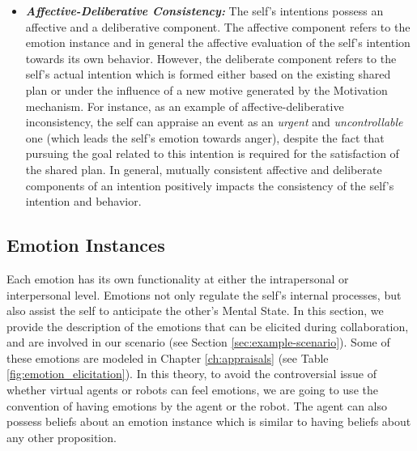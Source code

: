 \documentclass[12pt]{report}
\begin{document}
\begin{itemize}
  \item \textbf{\textit{Affective-Deliberative Consistency:}} The self's
  intentions possess an affective and a deliberative component. The affective
  component refers to the emotion instance and in general the affective
  evaluation of the self's intention towards its own behavior. However, the
  deliberate component refers to the self's actual intention which is formed
  either based on the existing shared plan or under the influence of a new
  motive generated by the Motivation mechanism. For instance, as an example of
  affective-deliberative inconsistency, the self can appraise an event as an
  \textit{urgent} and \textit{uncontrollable} one (which leads the self's
  emotion towards anger), despite the fact that pursuing the goal related
  to this intention is required for the satisfaction of the shared plan. In
  general, mutually consistent affective and deliberate components of an
  intention positively impacts the consistency of the self's intention and
  behavior.
\end{itemize}

\subsection{Emotion Instances}
\label{section-emotion-instances}

Each emotion has its own functionality at either the intrapersonal or
interpersonal level. Emotions not only regulate the self's internal processes,
but also assist the self to anticipate the other's Mental State. In this
section, we provide the description of the emotions that can be elicited
during collaboration, and are involved in our scenario (see Section
\ref{sec:example-scenario}). {\color{red}Some of these emotions are modeled in
Chapter \ref{ch:appraisals} (see Table \ref{fig:emotion_elicitation}).} In this
theory, to avoid the controversial issue of whether virtual agents or robots can
feel emotions, we are going to use the convention of having emotions by the
agent or the robot. The agent can also possess beliefs about an emotion instance
which is similar to having beliefs about any other proposition.
\end{document}
